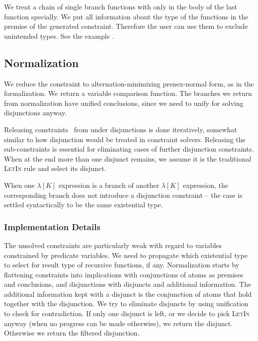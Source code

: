 \documentclass{article}
\newcommand{\tmname}[1]{\textsc{#1}}
\newcommand{\tmverbatim}[1]{{\ttfamily{#1}}}
\begin{document}
We treat a chain of single branch functions with only \tmverbatim{assert
false} in the body of the last function specially. We put all information
about the type of the functions in the premise of the generated constraint.
Therefore the user can use them to exclude unintended types. See the example
\tmverbatim{equal\_assert.gadt}.

\subsection{Normalization}

We reduce the constraint to alternation-minimizing prenex-normal form, as in
the formalization. We return a variable comparison function. The branches we
return from normalization have unified conclusions, since we need to unify for
solving disjunctions anyway.

Releasing constraints \ from under disjunctions is done iteratively, somewhat
similar to how disjunction would be treated in constraint solvers. Releasing
the sub-constraints is essential for eliminating cases of further disjunction
constraints. When at the end more than one disjunct remains, we assume it is
the traditional {\tmname{LetIn}} rule and select its disjunct.

When one $\lambda [K]$ expression is a branch of another $\lambda [K]$
expression, the corresponding branch does not introduce a disjunction
constraint -- the case is settled syntactically to be the same existential
type.

\subsubsection{Implementation Details}

The unsolved constraints are particularly weak with regard to variables
constrained by predicate variables. We need to propagate which existential
type to select for result type of recursive functions, if any. Normalization
starts by flattening constraints into implications with conjunctions of atoms
as premises and conclusions, and disjunctions with disjuncts and additional
information. The additional information kept with a disjunct is the
conjunction of atoms that hold together with the disjunction. We try to
eliminate disjuncts by using unification to check for contradiction. If only
one disjunct is left, or we decide to pick {\tmname{LetIn}} anyway (when no
progress can be made otherwise), we return the disjunct. Otherwise we return
the filtered disjunction.
\end{document}
